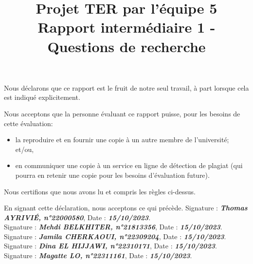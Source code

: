 \documentclass[mstat,12pt]{unswthesis}
\title{Projet TER par l'équipe 5\\[0.5cm]Rapport intermédiaire 1 -
Questions de recherche}
\author{\Authornameonly}
\begin{document}
\beforepreface




\vskip 2pc \noindent Nous déclarons que ce rapport est le fruit de notre seul travail, à part lorsque cela est indiqué  explicitement. 

\vskip 2pc  \noindent Nous acceptons que la personne évaluant ce rapport puisse, pour les besoins de cette évaluation:
\begin{itemize}
\item la reproduire et en fournir une copie à un autre membre de l'université; et/ou,
\item en communiquer une copie à un service en ligne de détection de plagiat (qui pourra en retenir une copie pour les besoins d'évaluation future).
\end{itemize}

\vskip 2pc \noindent Nous certifions que nous avons lu et compris les règles ci-dessus.\vspace{24pt}

\vskip 2pc \noindent En signant cette déclaration, nous acceptons ce qui précède.
\vskip 2pc \noindent
Signature : \textbf{\textit{Thomas AYRIVIÉ,
n°22000580}},   Date : \textbf{\textit{15/10/2023}}. \\[1cm]
Signature : \textbf{\textit{Mehdi BELKHITER,
n°21813356}},   Date : \textbf{\textit{15/10/2023}}. \\[1cm]
Signature : \textbf{\textit{Jamila CHERKAOUI,
n°22309204}},   Date : \textbf{\textit{15/10/2023}}. \\[1cm]
Signature : \textbf{\textit{Dina EL HIJJAWI,
n°22310171}},   Date : \textbf{\textit{15/10/2023}}. \\[1cm]
Signature : \textbf{\textit{Magatte LO,
n°22311161}},   Date : \textbf{\textit{15/10/2023}}. \\[1cm]
\vskip 1pc









\end{document}

